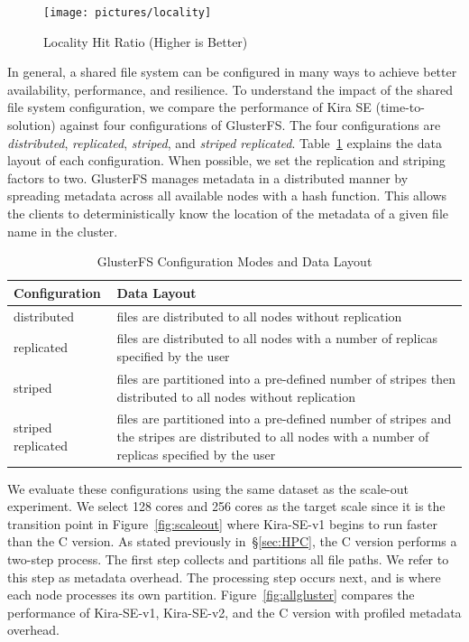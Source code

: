 \documentclass[10pt,journal,compsoc]{IEEEtran}
\begin{document}
\begin{figure}[h]
	\begin{center}
		\texttt{[image: pictures/locality]}
		\caption{Locality Hit Ratio (Higher is Better)
		\label{fig:locality}}
  	\end{center}
\end{figure}

In general, a shared file system can be configured in many ways to achieve better
availability, performance, and resilience. To understand the impact of the shared
file system configuration, we compare the performance of Kira SE (time-to-solution)
against four configurations of GlusterFS. The four configurations are
\emph{distributed}, \emph{replicated}, \emph{striped}, and \emph{striped replicated}. 
Table~\ref{tb:gluster-conf} explains the data layout of each configuration.
When possible, we set the replication and striping factors to two.
GlusterFS manages metadata in a distributed manner by spreading metadata across
all available nodes with a hash function. This allows the clients to deterministically
know the location of the metadata of a given file name in the cluster.

\begin{table}[h]
  \begin{center}
  \caption{GlusterFS Configuration Modes and Data Layout}
    \begin{small}
    \begin{tabular}{ | p{1.65cm} | p{6cm} |}
    \hline
    Configuration & Data Layout \\ \hline \hline
    distributed & files are distributed to all nodes without replication  \\ \hline
    replicated & files are distributed to all nodes with a number of replicas specified by the user \\ \hline  
    striped & files are partitioned into a pre-defined number of stripes then distributed to all nodes without replication \\ \hline
    striped replicated & files are partitioned into a pre-defined number of stripes and the stripes are distributed to all nodes with a number of replicas specified by the user \\ \hline
    \end{tabular}
    \end{small}   
  \label{tb:gluster-conf}     	
  \end{center}
\end{table}

We evaluate these configurations using the same dataset as the scale-out experiment. We
select 128 cores and 256 cores as the target scale since it is the transition point in
Figure~\ref{fig:scaleout} where Kira-SE-v1 begins to run faster than the C version. 
As stated previously in~\S\ref{sec:HPC}, the C version performs a two-step process. 
The first step collects and partitions all file paths. We refer to this step as metadata overhead. 
The processing step occurs next, and is where each node processes its own partition.
Figure~\ref{fig:allgluster} compares the performance of Kira-SE-v1, Kira-SE-v2,  and the C version with
profiled metadata overhead.  
\end{document}
